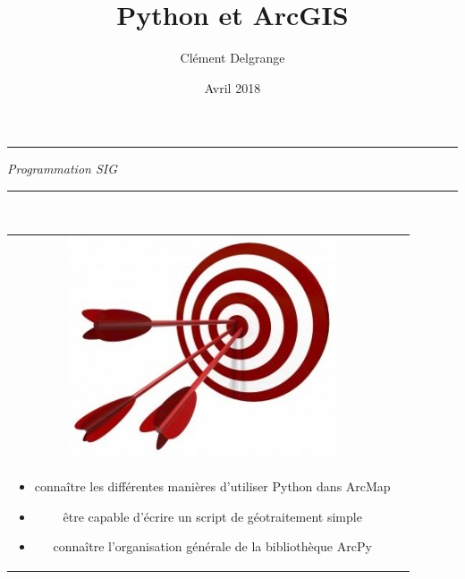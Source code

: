 \documentclass[11pt]{article}
\title{Python et ArcGIS}
\author{Clément Delgrange}
\date{Avril 2018}
\newenvironment{objectifs}{
	\begin{lrbox}{\mybox}
		\begin{minipage}{0.9\textwidth}
			\vspace{1em}
			\begin{tabular}[t t]{c c}
				\includegraphics[width=0.1\linewidth]{img/goals.jpg} &
				\begin{minipage}[c]{0.8\linewidth}
					\hspace{2em}\textbf{\large{Objectifs :}} \\
}{
				\end{minipage}
			\end{tabular}
			\vspace{1em}
		\end{minipage}
	\end{lrbox}
	\fbox{\usebox{\mybox}}
}
\begin{document}
\parindent=0cm


\begin{titlepage}
\makeatletter
	\begin{sffamily}
		\begin{flushleft}
		\end{flushleft}
		\begin{flushright}
		\end{flushright}

		\vspace{4cm}

		\begin{center}
			\hrule
				\vspace{1em}
				{\small \textit{Programmation SIG}}\\
				\vspace{0.5cm}
				{\huge\bfseries \@title}
				\vspace{1cm}
			\hrule

			\vspace{3.5cm}
			\vspace{5cm}

			\large \textit{\@author}\\
			\small \textit{\@date}
		\end{center}
	\end{sffamily}
\makeatother
\end{titlepage}



\begin{objectifs}
\begin{itemize}
	\item connaître les différentes manières d'utiliser Python dans ArcMap
	\item être capable d'écrire un script de géotraitement simple
	\item connaître l'organisation générale de la bibliothèque ArcPy
\end{itemize}
\end{objectifs}


\end{document}
